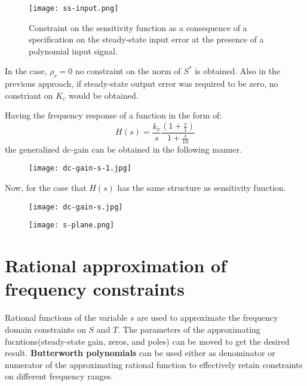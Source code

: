 \begin{figure}[H]
    \centering
    \texttt{[image: ss-input.png]}
    \caption{Constraint on the sensitivity function as a consequence of a specification on the steady-state input error at the presence of a polynomial input signal.}
    \label{fig:ss-input}
\end{figure}

In the case, $\rho_r = 0$ no constraint on the norm of $S^{*}$ is obtained. Also in the previous approach, if steady-state output error was required to be zero, no constriant on $K_c$ would be obtained.
\begin{factbox}
Having the frequency response of a function in the form of:
\[
H(s) = \frac{k_\nu}{s}\frac{(1 + \frac{s}{1})}{1 + \frac{s}{10}}
\]
the generalized dc-gain can be obtained in the following manner.
\begin{figure}[H]
    \centering
    \texttt{[image: dc-gain-s-1.jpg]}
    \caption{}
    \label{fig:}
\end{figure}

Now, for the case that $H(s)$ has the same structure as sensitivity function.

\begin{figure}[H]
    \centering
    \texttt{[image: dc-gain-s.jpg]}
    \caption{}
    \label{fig:}
\end{figure}

\end{factbox}

\begin{factbox}
\begin{figure}[H]
    \centering
    \texttt{[image: s-plane.png]}
    \caption{}
    \label{fig:}
\end{figure}
\end{factbox}

\section{Rational approximation of frequency constraints}
Rational functions of the variable $s$ are used to approximate the frequency domain constraints on $S$ and $T$. The parameters of the approximating fucntions(steady-state gain, zeros, and poles) can be moved to get the desired result. \textbf{Butterworth polynomials} can be used either as denominator or numerator of the approximating rational function to effectively retain constraints on different frequency ranges.

